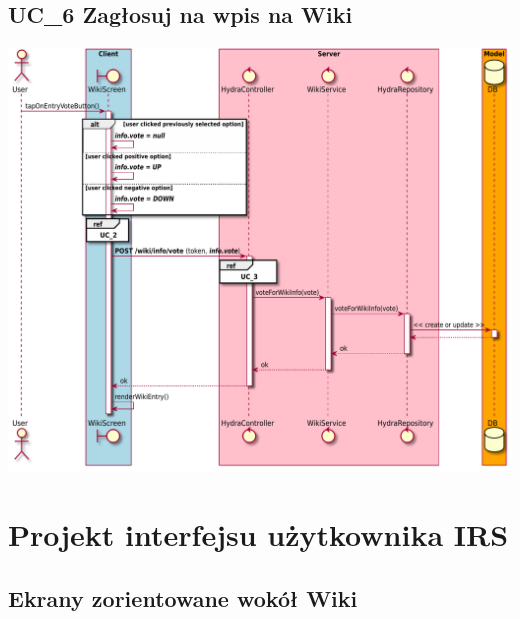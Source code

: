 \documentclass{scrreprt}
\begin{document}
\section{UC\_6 Zagłosuj na wpis na Wiki}
\includegraphics[width=\textwidth, keepaspectratio]{graphics/sequence_diagram_wiki_vote.pdf}


\chapter{Projekt interfejsu użytkownika IRS}

\section{Ekrany zorientowane wokół Wiki}
\begin{center}
\end{center}
\end{document}
